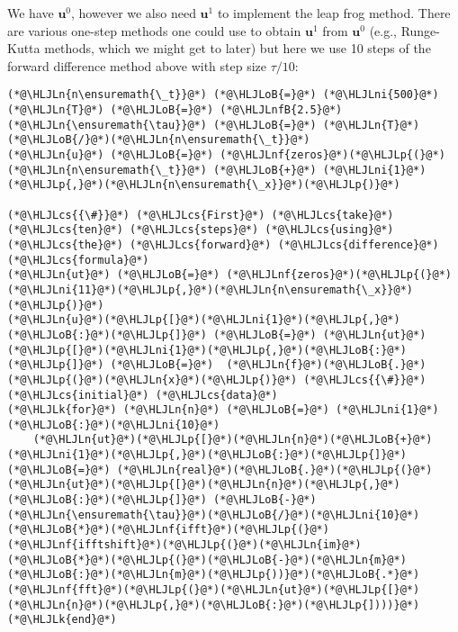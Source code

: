 \documentclass[12pt,a4paper]{article}
\newcommand{\HLJLk}[1]{\textcolor[RGB]{148,91,176}{\textbf{#1}}}
\newcommand{\HLJLn}[1]{#1}
\newcommand{\HLJLnf}[1]{\textcolor[RGB]{66,102,213}{#1}}
\newcommand{\HLJLnfB}[1]{\textcolor[RGB]{59,151,46}{#1}}
\newcommand{\HLJLni}[1]{\textcolor[RGB]{59,151,46}{#1}}
\newcommand{\HLJLoB}[1]{\textcolor[RGB]{102,102,102}{\textbf{#1}}}
\newcommand{\HLJLp}[1]{#1}
\newcommand{\HLJLcs}[1]{\textcolor[RGB]{153,153,119}{\textit{#1}}}
\begin{document}
We have $\mathbf{u}^0$, however we also need $\mathbf{u}^1$ to implement the leap frog method.  There are various one-step methods one could use to obtain $\mathbf{u}^1$ from $\mathbf{u}^0$ (e.g., Runge-Kutta methods, which we might get to later) but here we use 10 steps of the forward difference method above with step size $\tau/10$:


\begin{lstlisting}
(*@\HLJLn{n\ensuremath{\_t}}@*) (*@\HLJLoB{=}@*) (*@\HLJLni{500}@*)
(*@\HLJLn{T}@*) (*@\HLJLoB{=}@*) (*@\HLJLnfB{2.5}@*)
(*@\HLJLn{\ensuremath{\tau}}@*) (*@\HLJLoB{=}@*) (*@\HLJLn{T}@*)(*@\HLJLoB{/}@*)(*@\HLJLn{n\ensuremath{\_t}}@*)
(*@\HLJLn{u}@*) (*@\HLJLoB{=}@*) (*@\HLJLnf{zeros}@*)(*@\HLJLp{(}@*)(*@\HLJLn{n\ensuremath{\_t}}@*) (*@\HLJLoB{+}@*) (*@\HLJLni{1}@*)(*@\HLJLp{,}@*)(*@\HLJLn{n\ensuremath{\_x}}@*)(*@\HLJLp{)}@*)

(*@\HLJLcs{{\#}}@*) (*@\HLJLcs{First}@*) (*@\HLJLcs{take}@*) (*@\HLJLcs{ten}@*) (*@\HLJLcs{steps}@*) (*@\HLJLcs{using}@*) (*@\HLJLcs{the}@*) (*@\HLJLcs{forward}@*) (*@\HLJLcs{difference}@*) (*@\HLJLcs{formula}@*)
(*@\HLJLn{ut}@*) (*@\HLJLoB{=}@*) (*@\HLJLnf{zeros}@*)(*@\HLJLp{(}@*)(*@\HLJLni{11}@*)(*@\HLJLp{,}@*)(*@\HLJLn{n\ensuremath{\_x}}@*)(*@\HLJLp{)}@*)
(*@\HLJLn{u}@*)(*@\HLJLp{[}@*)(*@\HLJLni{1}@*)(*@\HLJLp{,}@*)(*@\HLJLoB{:}@*)(*@\HLJLp{]}@*) (*@\HLJLoB{=}@*) (*@\HLJLn{ut}@*)(*@\HLJLp{[}@*)(*@\HLJLni{1}@*)(*@\HLJLp{,}@*)(*@\HLJLoB{:}@*)(*@\HLJLp{]}@*) (*@\HLJLoB{=}@*)  (*@\HLJLn{f}@*)(*@\HLJLoB{.}@*)(*@\HLJLp{(}@*)(*@\HLJLn{x}@*)(*@\HLJLp{)}@*) (*@\HLJLcs{{\#}}@*) (*@\HLJLcs{initial}@*) (*@\HLJLcs{data}@*)
(*@\HLJLk{for}@*) (*@\HLJLn{n}@*) (*@\HLJLoB{=}@*) (*@\HLJLni{1}@*)(*@\HLJLoB{:}@*)(*@\HLJLni{10}@*)
    (*@\HLJLn{ut}@*)(*@\HLJLp{[}@*)(*@\HLJLn{n}@*)(*@\HLJLoB{+}@*)(*@\HLJLni{1}@*)(*@\HLJLp{,}@*)(*@\HLJLoB{:}@*)(*@\HLJLp{]}@*) (*@\HLJLoB{=}@*) (*@\HLJLn{real}@*)(*@\HLJLoB{.}@*)(*@\HLJLp{(}@*)(*@\HLJLn{ut}@*)(*@\HLJLp{[}@*)(*@\HLJLn{n}@*)(*@\HLJLp{,}@*)(*@\HLJLoB{:}@*)(*@\HLJLp{]}@*) (*@\HLJLoB{-}@*) (*@\HLJLn{\ensuremath{\tau}}@*)(*@\HLJLoB{/}@*)(*@\HLJLni{10}@*)(*@\HLJLoB{*}@*)(*@\HLJLnf{ifft}@*)(*@\HLJLp{(}@*)(*@\HLJLnf{ifftshift}@*)(*@\HLJLp{(}@*)(*@\HLJLn{im}@*)(*@\HLJLoB{*}@*)(*@\HLJLp{(}@*)(*@\HLJLoB{-}@*)(*@\HLJLn{m}@*)(*@\HLJLoB{:}@*)(*@\HLJLn{m}@*)(*@\HLJLp{))}@*)(*@\HLJLoB{.*}@*)(*@\HLJLnf{fft}@*)(*@\HLJLp{(}@*)(*@\HLJLn{ut}@*)(*@\HLJLp{[}@*)(*@\HLJLn{n}@*)(*@\HLJLp{,}@*)(*@\HLJLoB{:}@*)(*@\HLJLp{])))}@*)
(*@\HLJLk{end}@*)


\end{lstlisting}
\end{document}
